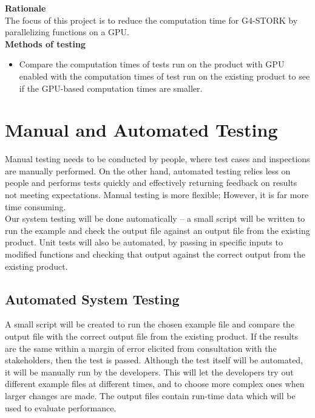\documentclass[12pt]{article}
\begin{document}
\textbf{Rationale}\\
The focus of this project is to reduce the computation time for G4-STORK by parallelizing functions on a GPU.\\

\textbf{Methods of testing}
\begin{itemize}
\item Compare the computation times of tests run on the product with GPU enabled with the computation times of test run on the existing product to see if the GPU-based computation times are smaller.
\end{itemize}
 
\section{Manual and Automated Testing}
Manual testing needs to be conducted by people, where test cases and inspections are manually performed. On the other hand, automated testing relies less on people and performs tests quickly and effectively returning feedback on results not meeting expectations. Manual testing is more flexible; However, it is far more time consuming.\\

Our system testing will be done automatically -- a small script will be written to run the example and check the output file against an output file from the existing product. Unit tests will also be automated, by passing in specific inputs to modified functions and checking that output against the correct output from the existing product.

\subsection{Automated System Testing}
A small script will be created to run the chosen example file and compare the output file with the correct output file from the existing product. If the results are the same within a margin of error elicited from consultation with the stakeholders, then the test is passed. Although the test itself will be automated, it will be manually run by the developers. This will let the developers try out different example files at different times, and to choose more complex ones when larger changes are made. The output files contain run-time data which will be used to evaluate performance.
\end{document}
